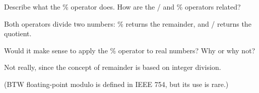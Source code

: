 \Q Describe what the \% operator does.
How are the / and \% operators related?

\begin{answer}
Both operators divide two numbers: \% returns the remainder, and / returns the quotient.
\end{answer}


\Q Would it make sense to apply the \% operator to real numbers?
Why or why not?

\begin{answer}
Not really, since the concept of remainder is based on integer division.

(BTW floating-point modulo is defined in IEEE 754, but its use is rare.)
\end{answer}

